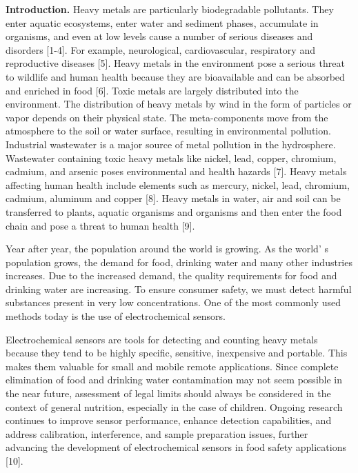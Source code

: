 \begin{multicols}{2}
{\bfseries Introduction.} Heavy metals are particularly biodegradable
pollutants. They enter aquatic ecosystems, enter water and
sediment phases, accumulate in organisms, and even at low levels
cause a number of serious diseases and disorders {[}1-4{]}. For
example, neurological, cardiovascular, respiratory and
reproductive diseases {[}5{]}. Heavy metals in the environment
pose a serious threat to wildlife and human health because they
are bioavailable and can be absorbed and enriched in food
{[}6{]}. Toxic metals are largely distributed into the
environment. The distribution of heavy metals by wind in the
form of particles or vapor depends on their physical state. The
meta-components move from the atmosphere to the soil or water
surface, resulting in environmental pollution. Industrial
wastewater is a major source of metal pollution in the
hydrosphere. Wastewater containing toxic heavy metals like
nickel, lead, copper, chromium, cadmium, and arsenic poses
environmental and health hazards {[}7{]}. Heavy metals affecting
human health include elements such as mercury, nickel, lead,
chromium, cadmium, aluminum and copper {[}8{]}. Heavy metals in
water, air and soil can be transferred to plants, aquatic
organisms and organisms and then enter the food chain and
pose a threat to human health {[}9{]}.

Year after year, the population around the world is growing. As
the world' s population grows, the demand for
food, drinking water and many other industries increases. Due
to the increased demand, the quality requirements for food and
drinking water are increasing. To ensure consumer safety, we
must detect harmful substances present in very low
concentrations. One of the most commonly used methods today is
the use of electrochemical sensors.

Electrochemical sensors are tools for detecting and counting
heavy metals because they tend to be highly specific, sensitive,
inexpensive and portable. This makes them valuable for small
and mobile remote applications. Since complete elimination of
food and drinking water contamination may not seem possible in
the near future, assessment of legal limits should always be
considered in the context of general nutrition, especially in the
case of children. Ongoing research continues to improve sensor
performance, enhance detection capabilities, and address
calibration, interference, and sample preparation issues, further
advancing the development of electrochemical sensors in food
safety applications {[}10{]}.


\end{multicols}
